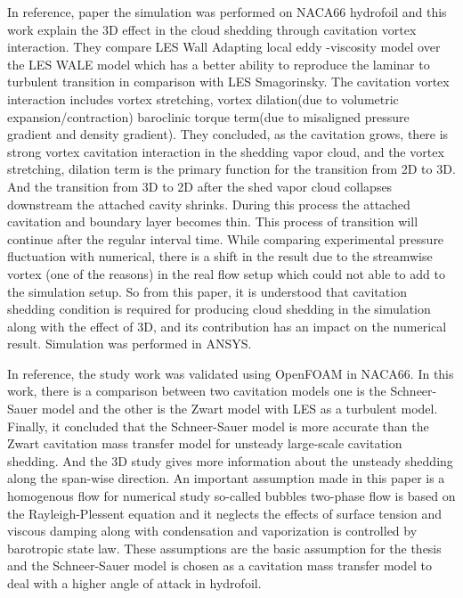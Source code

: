 In reference, paper \cite{JI2015, JI2017} the simulation was performed
on NACA66 hydrofoil and this work explain the 3D effect in the cloud
shedding through cavitation vortex interaction. They compare LES Wall
Adapting local eddy -viscosity model over the LES WALE model which has
a better ability to reproduce the laminar to turbulent transition in
comparison with LES Smagorinsky. The cavitation vortex interaction
includes vortex stretching, vortex dilation(due to volumetric
expansion/contraction) baroclinic torque term(due to misaligned
pressure gradient and density gradient). They concluded, as the
cavitation grows, there is strong vortex cavitation interaction in the
shedding vapor cloud, and the vortex stretching, dilation term is the
primary function for the transition from 2D to 3D. And the transition
from 3D to 2D after the shed vapor cloud collapses downstream the
attached cavity shrinks. During this process the attached cavitation
and boundary layer becomes thin. This process of transition will
continue after the regular interval time. While comparing experimental
pressure fluctuation with numerical, there is a shift in the result
due to the streamwise vortex (one of the reasons) in the real flow
setup which could not able to add to the simulation setup. So from
this paper, it is understood that cavitation shedding condition is
required for producing cloud shedding in the simulation along with the
effect of 3D, and its contribution has an impact on the numerical
result. Simulation was performed in ANSYS.

In reference, \cite{Hidalgo2014,Hai2020,Hidalgo2014-2} the study work
was validated using OpenFOAM in NACA66. In this work, there is a
comparison between two cavitation models one is the Schneer-Sauer
model and the other is the Zwart model with LES as a turbulent
model. Finally, it concluded that the Schneer-Sauer model is more
accurate than the Zwart cavitation mass transfer model for unsteady
large-scale cavitation shedding. And the 3D study gives more
information about the unsteady shedding along the span-wise
direction. An important assumption made in this paper is a homogenous
flow for numerical study so-called bubbles two-phase flow is based on
the Rayleigh-Plessent equation and it neglects the effects of surface
tension and viscous damping along with condensation and vaporization
is controlled by barotropic state law. These assumptions are the basic
assumption for the thesis and the Schneer-Sauer model is chosen as a
cavitation mass transfer model to deal with a higher angle of attack
in hydrofoil.
  

